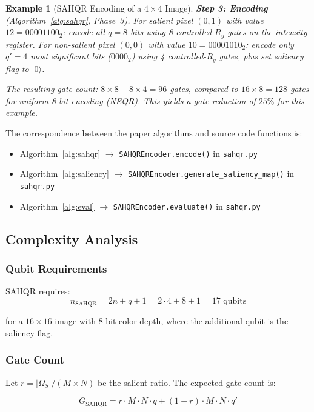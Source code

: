 \documentclass{ipol}
\newtheorem{example}{Example}
\begin{document}
\begin{example}[SAHQR Encoding of a $4 \times 4$ Image]
\textbf{Step 3: Encoding} (Algorithm~\ref{alg:sahqr}, Phase~3).
For salient pixel $(0,1)$ with value $12 = 00001100_2$: encode all $q=8$ bits using 8 controlled-$R_y$ gates on the intensity register.
For non-salient pixel $(0,0)$ with value $10 = 00001010_2$: encode only $q'=4$ most significant bits ($0000_2$) using 4 controlled-$R_y$ gates, plus set saliency flag to $|0\rangle$.

The resulting gate count: $8 \times 8 + 8 \times 4 = 96$ gates, compared to $16 \times 8 = 128$ gates for uniform 8-bit encoding (NEQR). This yields a gate reduction of $25\%$ for this example.
\end{example}

The correspondence between the paper algorithms and source code functions is:
\begin{itemize}
\item Algorithm~\ref{alg:sahqr} $\rightarrow$ \verb|SAHQREncoder.encode()| in \verb|sahqr.py|
\item Algorithm~\ref{alg:saliency} $\rightarrow$ \verb|SAHQREncoder.generate_saliency_map()| in \verb|sahqr.py|
\item Algorithm~\ref{alg:eval} $\rightarrow$ \verb|SAHQREncoder.evaluate()| in \verb|sahqr.py|
\end{itemize}

\subsection{Complexity Analysis}

\subsubsection{Qubit Requirements}

SAHQR requires:
\begin{equation}
n_{\text{SAHQR}} = 2n + q + 1 = 2 \cdot 4 + 8 + 1 = 17 \text{ qubits}
\label{eq:sahqr_qubits}
\end{equation}

for a $16 \times 16$ image with 8-bit color depth, where the additional qubit is the saliency flag.

\subsubsection{Gate Count}

Let $r = |\Omega_S| / (M \times N)$ be the salient ratio. The expected gate count is:

\begin{equation}
G_{\text{SAHQR}} = r \cdot M \cdot N \cdot q + (1-r) \cdot M \cdot N \cdot q'
\label{eq:sahqr_gates}
\end{equation}
\end{document}

